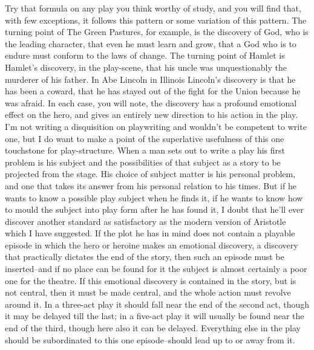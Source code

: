 \documentclass[9pt,twoside]{extarticle}
\begin{document}
Try that formula on any play you think worthy of study, and you will find that, with few exceptions, it follows this pattern or some variation of this pattern. The turning point of The Green Pastures, for example, is the discovery of God, who is the leading character, that even he must learn and grow, that a God who is to endure must conform to the laws of change. The turning point of Hamlet is Hamlet's discovery, in the play-scene, that his uncle was unquestionably the murderer of his father. In Abe Lincoln in Illinois Lincoln's discovery is that he has been a coward, that he has stayed out of the fight for the Union because he was afraid. In each case, you will note, the discovery has a profound emotional effect on the hero, and gives an entirely new direction to his action in the play. I'm not writing a disquisition on playwriting and wouldn't be competent to write one, but I do want to make a point of the superlative usefulness of this one touchstone for play-structure. When a man sets out to write a play his first problem is his subject and the possibilities of that subject as a story to be projected from the stage. His choice of subject matter is his personal problem, and one that takes its answer from his personal relation to his times. But if he wants to know a possible play subject when he finds it, if he wants to know how to mould the subject into play form after he has found it, I doubt that he'll ever discover another standard as satisfactory as the modern version of Aristotle which I have suggested. If the plot he has in mind does not contain a playable episode in which the hero or heroine makes an emotional discovery, a discovery that practically dictates the end of the story, then such an episode must be inserted--and if no place can be found for it the subject is almost certainly a poor one for the theatre. If this emotional discovery is contained in the story, but is not central, then it must be made central, and the whole action must revolve around it. In a three-act play it should fall near the end of the second act, though it may be delayed till the last; in a five-act play it will usually be found near the end of the third, though here also it can be delayed. Everything else in the play should be subordinated to this one episode--should lead up to or away from it.
\end{document}
